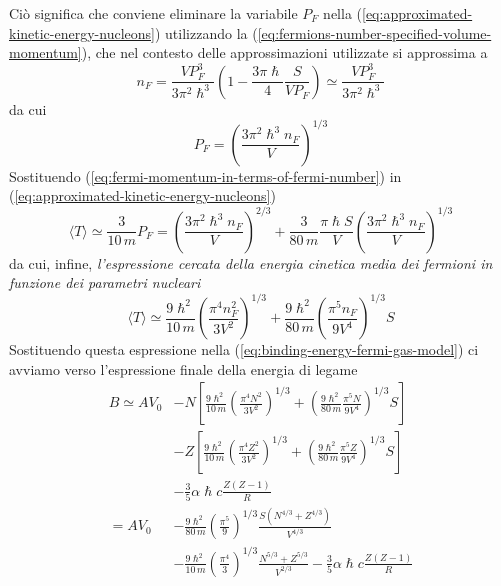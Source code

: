 Ciò significa che conviene eliminare la variabile $P_{F}$ nella (\ref{eq:approximated-kinetic-energy-nucleons}) utilizzando la (\ref{eq:fermions-number-specified-volume-momentum}), che nel contesto delle approssimazioni utilizzate si approssima a
\[
n_{F} =  \frac{VP_{F}^{3}}{3 \pi^{2}\hslash^{3}} \left( 1 -  \frac{3\pi \hslash}{4} \frac{S}{V P_{F}} \right) \simeq \frac{VP_{F}^{3}}{3 \pi^{2} \hslash^{3}}
\]
da cui
\begin{equation}
	P_{F} = \left( \frac{3\pi^{2}\hslash^{3}n_{F}}{V} \right)^{1/3}
	\label{eq:fermi-momentum-in-terms-of-fermi-number}
\end{equation}
Sostituendo (\ref{eq:fermi-momentum-in-terms-of-fermi-number}) in (\ref{eq:approximated-kinetic-energy-nucleons})
\[
\langle T \rangle \simeq \frac{3}{10 \, m}     P_{F} = \left( \frac{3\pi^{2}\hslash^{3}n_{F}}{V} \right)^{2/3} + \frac{3}{80 \, m} \frac{\pi \hslash S}{V}\left( \frac{3\pi^{2}\hslash^{3}n_{F}}{V} \right)^{1/3}
\]
da cui, infine, \emph{l’espressione cercata della energia cinetica media dei fermioni in funzione dei parametri nucleari}
\[
\langle T \rangle \simeq \frac{9\hslash^{2}}{10 \, m} \left( \frac{\pi^{4}n_{F}^{2}}{3 V^{2}}\right)^{1/3}  + \frac{9\hslash^{2}}{80 \, m}\left( \frac{\pi^{5}n_{F}}{9V^{4}} \right)^{1/3}S
\]
Sostituendo questa espressione nella (\ref{eq:binding-energy-fermi-gas-model}) ci avviamo verso l’espressione finale della energia di legame
\begin{align*}
	B \simeq A V_{0} &- N \left[ \frac{9\hslash^{2}}{10\, m} \left( \frac{\pi^{4}N^{2}}{3 V^{2}} \right)^{1/3} + \left( \frac{9\hslash^{2}}{80 \, m} \frac{\pi^{5}N}{9V^{4}} \right)^{1/3}S \right] \\
	& -Z \left[ \frac{9\hslash^{2}}{10\, m} \left( \frac{\pi^{4}Z^{2}}{3 V^{2}} \right)^{1/3} + \left( \frac{9\hslash^{2}}{80 \, m} \frac{\pi^{5}Z}{9V^{4}} \right)^{1/3}S \right] \\
	& - \frac{3}{5} \alpha \hslash c \frac{Z(Z-1)}{R} \\
	= AV_{0} & - \frac{9\hslash^{2}}{80 \, m}\left( \frac{\pi^{5}}{9} \right)^{1/3} \frac{S(N^{4/3}+Z^{4/3})}{V^{4/3}} \\
	&- \frac{9\hslash^{2}}{10 \, m} \left( \frac{\pi^{4}}{3} \right)^{1/3} \frac{N^{5/3}+Z^{5/3}}{V^{2/3}} - \frac{3}{5} \alpha \hslash c \frac{Z(Z-1)}{R}
\end{align*}
